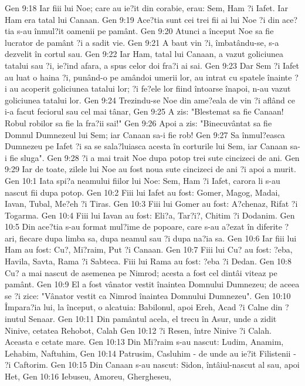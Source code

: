 Gen 9:18  Iar fiii lui Noe; care au ie?it din corabie, erau: Sem, Ham ?i Iafet. Iar Ham era tatal lui Canaan.
Gen 9:19  Ace?tia sunt cei trei fii ai lui Noe ?i din ace?tia s-au înmul?it oamenii pe pamânt.
Gen 9:20  Atunci a început Noe sa fie lucrator de pamânt ?i a sadit vie.
Gen 9:21  A baut vin ?i, îmbatându-se, s-a dezvelit în cortul sau.
Gen 9:22  Iar Ham, tatal lui Canaan, a vazut goliciunea tatalui sau ?i, ie?ind afara, a spus celor doi fra?i ai sai.
Gen 9:23  Dar Sem ?i Iafet au luat o haina ?i, punând-o pe amândoi umerii lor, au intrat cu spatele înainte ?i au acoperit goliciunea tatalui lor; ?i fe?ele lor fiind întoarse înapoi, n-au vazut goliciunea tatalui lor.
Gen 9:24  Trezindu-se Noe din ame?eala de vin ?i aflând ce i-a facut feciorul sau cel mai tânar,
Gen 9:25  A zis: "Blestemat sa fie Canaan! Robul robilor sa fie la fra?ii sai!"
Gen 9:26  Apoi a zis: "Binecuvântat sa fie Domnul Dumnezeul lui Sem; iar Canaan sa-i fie rob!
Gen 9:27  Sa înmul?easca Dumnezeu pe Iafet ?i sa se sala?luiasca acesta în corturile lui Sem, iar Canaan sa-i fie sluga".
Gen 9:28  ?i a mai trait Noe dupa potop trei sute cincizeci de ani.
Gen 9:29  Iar de toate, zilele lui Noe au fost noua sute cincizeci de ani ?i apoi a murit.
Gen 10:1  Iata spi?a neamului fiilor lui Noe: Sem, Ham ?i Iafet, carora li s-au nascut fii dupa potop.
Gen 10:2  Fiii lui Iafet au fost: Gomer, Magog, Madai, Iavan, Tubal, Me?eh ?i Tiras.
Gen 10:3  Fiii lui Gomer au fost: A?chenaz, Rifat ?i Togarma.
Gen 10:4  Fiii lui Iavan au fost: Eli?a, Tar?i?, Chitim ?i Dodanim.
Gen 10:5  Din ace?tia s-au format mul?ime de popoare, care s-au a?ezat în diferite ?ari, fiecare dupa limba sa, dupa neamul sau ?i dupa na?ia sa.
Gen 10:6  Iar fiii lui Ham au fost: Cu?, Mi?raim, Put ?i Canaan.
Gen 10:7  Fiii lui Cu? au fost: ?eba, Havila, Savta, Rama ?i Sabteca. Fiii lui Rama au fost: ?eba ?i Dedan.
Gen 10:8  Cu? a mai nascut de asemenea pe Nimrod; acesta a fost cel dintâi viteaz pe pamânt.
Gen 10:9  El a fost vânator vestit înaintea Domnului Dumnezeu; de aceea se ?i zice: "Vânator vestit ca Nimrod înaintea Domnului Dumnezeu".
Gen 10:10  Împara?ia lui, la început, o alcatuia: Babilonul, apoi Ereh, Acad ?i Calne din ?inutul Senaar.
Gen 10:11  Din pamântul acela, el trecu în Asur, unde a zidit Ninive, cetatea Rehobot, Calah
Gen 10:12  ?i Resen, între Ninive ?i Calah. Aceasta e cetate mare.
Gen 10:13  Din Mi?raim s-au nascut: Ludim, Anamim, Lehabim, Naftuhim,
Gen 10:14  Patrusim, Casluhim - de unde au ie?it Filistenii - ?i Caftorim.
Gen 10:15  Din Canaan s-au nascut: Sidon, întâiul-nascut al sau, apoi Het,
Gen 10:16  Iebuseu, Amoreu, Ghergheseu,
